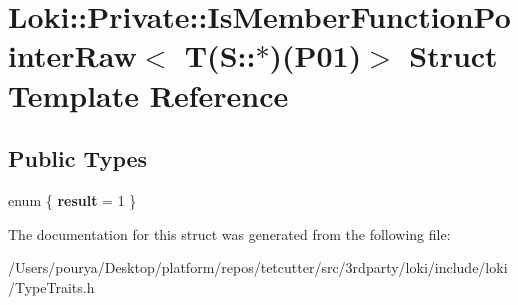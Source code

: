 \hypertarget{structLoki_1_1Private_1_1IsMemberFunctionPointerRaw_3_01T_07S_1_1_5_08_07P01_08_4}{}\section{Loki\+:\+:Private\+:\+:Is\+Member\+Function\+Pointer\+Raw$<$ T(S\+:\+:$\ast$)(P01)$>$ Struct Template Reference}
\label{structLoki_1_1Private_1_1IsMemberFunctionPointerRaw_3_01T_07S_1_1_5_08_07P01_08_4}
\subsection*{Public Types}
\begin{DoxyCompactItemize}
\item 
\hypertarget{structLoki_1_1Private_1_1IsMemberFunctionPointerRaw_3_01T_07S_1_1_5_08_07P01_08_4_a35f5e11e3ef53739bf5d00fc9e71abfe}{}enum \{ {\bfseries result} = 1
 \}\label{structLoki_1_1Private_1_1IsMemberFunctionPointerRaw_3_01T_07S_1_1_5_08_07P01_08_4_a35f5e11e3ef53739bf5d00fc9e71abfe}

\end{DoxyCompactItemize}


The documentation for this struct was generated from the following file\+:\begin{DoxyCompactItemize}
\item 
/\+Users/pourya/\+Desktop/platform/repos/tetcutter/src/3rdparty/loki/include/loki/Type\+Traits.\+h\end{DoxyCompactItemize}
